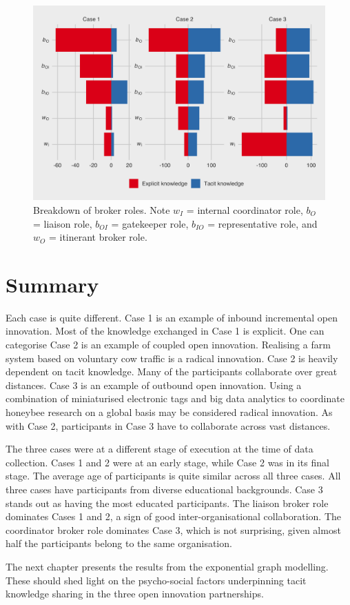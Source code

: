 \begin{figure}
\centering
\includegraphics[width = \linewidth]{Images/gf_brokerage.png}
\caption[Breakdown of broker roles]{Breakdown of \citet{gould1989structures} broker roles. Note $w_I$ = internal coordinator role, $b_O$ = liaison role, $b_{OI}$ = gatekeeper role, $b_{IO}$ = representative role, and $w_O$ = itinerant broker role.}
\label{fig:gf_brokerage}
\end{figure}

\section{Summary}

Each case is quite different. Case 1 is an example of inbound incremental open innovation. Most of the knowledge exchanged in Case 1 is explicit. One can categorise Case 2 is an example of coupled open innovation. Realising a farm system based on voluntary cow traffic is a radical innovation. Case 2 is heavily dependent on tacit knowledge. Many of the participants collaborate over great distances. Case 3 is an example of outbound open innovation. Using a combination of miniaturised electronic tags and big data analytics to coordinate honeybee research on a global basis may be considered radical innovation. As with Case 2, participants in Case 3 have to collaborate across vast distances. \medskip

The three cases were at a different stage of execution at the time of data collection. Cases 1 and 2 were at an early stage, while Case 2 was in its final stage. The average age of participants is quite similar across all three cases. All three cases have participants from diverse educational backgrounds. Case 3 stands out as having the most educated participants. The liaison broker role dominates Cases 1 and 2, a sign of good inter-organisational collaboration. The coordinator broker role dominates Case 3, which is not surprising, given almost half the participants belong to the same organisation. \medskip

The next chapter presents the results from the exponential graph modelling. These should shed light on the psycho-social factors underpinning tacit knowledge sharing in the three open innovation partnerships. 